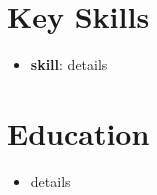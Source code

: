 \documentclass[9pt]{smart-cv}
\begin{document}
\begin{two-col}
    \section{Key Skills}

    \begin{itemize}
      \item \textbf{skill}: details
    \end{itemize}

    \section{Education}

    \begin{itemize}
      \item details
    \end{itemize}

  \end{two-col}
\end{document}
